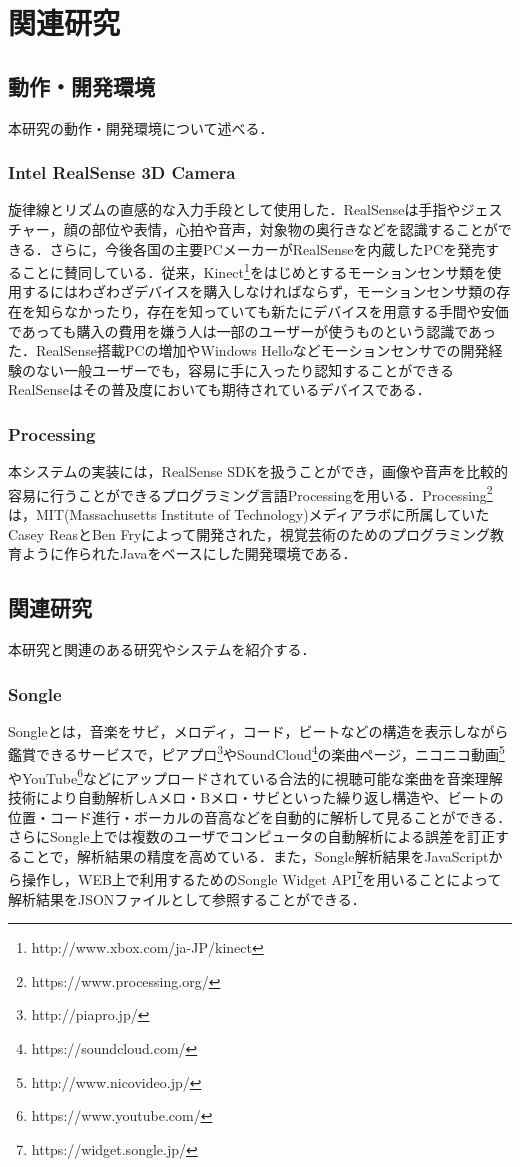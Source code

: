 \chapter{関連研究}
\section{動作・開発環境}
本研究の動作・開発環境について述べる．

\subsection{Intel RealSense 3D Camera}
旋律線とリズムの直感的な入力手段として使用した．RealSenseは手指やジェスチャー，顔の部位や表情，心拍や音声，対象物の奥行きなどを認識することができる．さらに，今後各国の主要PCメーカーがRealSenseを内蔵したPCを発売することに賛同している．従来，Kinect\footnote{http://www.xbox.com/ja-JP/kinect}をはじめとするモーションセンサ類を使用するにはわざわざデバイスを購入しなければならず，モーションセンサ類の存在を知らなかったり，存在を知っていても新たにデバイスを用意する手間や安価であっても購入の費用を嫌う人は一部のユーザーが使うものという認識であった．RealSense搭載PCの増加やWindows Helloなどモーションセンサでの開発経験のない一般ユーザーでも，容易に手に入ったり認知することができるRealSenseはその普及度においても期待されているデバイスである．

\subsection{Processing}
本システムの実装には，RealSense SDKを扱うことができ，画像や音声を比較的容易に行うことができるプログラミング言語Processingを用いる．Processing\footnote{https://www.processing.org/}は，MIT(Massachusetts Institute of Technology)メディアラボに所属していたCasey ReasとBen Fryによって開発された，視覚芸術のためのプログラミング教育ように作られたJavaをベースにした開発環境である．\cite{takahasi2010}
\section{関連研究}
本研究と関連のある研究やシステムを紹介する．

\subsection{Songle}
Songle\cite{songle}とは，音楽をサビ，メロディ，コード，ビートなどの構造を表示しながら鑑賞できるサービスで，ピアプロ\footnote{http://piapro.jp/}やSoundCloud\footnote{https://soundcloud.com/}の楽曲ページ，ニコニコ動画\footnote{http://www.nicovideo.jp/}やYouTube\footnote{https://www.youtube.com/}などにアップロードされている合法的に視聴可能な楽曲を音楽理解技術により自動解析しAメロ・Bメロ・サビといった繰り返し構造や、ビートの位置・コード進行・ボーカルの音高などを自動的に解析して見ることができる．さらにSongle上では複数のユーザでコンピュータの自動解析による誤差を訂正することで，解析結果の精度を高めている．また，Songle解析結果をJavaScriptから操作し，WEB上で利用するためのSongle Widget API\footnote{https://widget.songle.jp/}を用いることによって解析結果をJSONファイルとして参照することができる．

